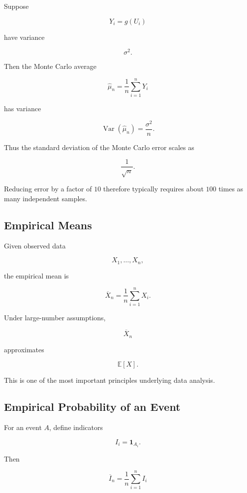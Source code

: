 Suppose

\[
Y_i=g(U_i)
\]

have variance

\[
\sigma^2.
\]

Then the Monte Carlo average

\[
\widehat{\mu}_n
=
\frac1n
\sum_{i=1}^{n}Y_i
\]

has variance

\[
\boxed{
\operatorname{Var}(\widehat{\mu}_n)
=
\frac{\sigma^2}{n}.
}
\]

Thus the standard deviation of the Monte Carlo error scales as

\[
\boxed{
\frac1{\sqrt{n}}.
}
\]

Reducing error by a factor of \(10\) therefore typically requires about
\(100\) times as many independent samples.

\subsection{Empirical Means}
\label{subsec:empirical-means}

Given observed data

\[
X_1,\ldots,X_n,
\]

the empirical mean is

\[
\boxed{
\overline{X}_n
=
\frac1n
\sum_{i=1}^{n}X_i.
}
\]

Under large-number assumptions,

\[
\overline{X}_n
\]

approximates

\[
\mathbb{E}[X].
\]

This is one of the most important principles underlying data analysis.

\subsection{Empirical Probability of an Event}
\label{subsec:empirical-event-probability}

For an event \(A\), define indicators

\[
I_i
=
\mathbf{1}_{A_i}.
\]

Then

\[
\overline{I}_n
=
\frac1n
\sum_{i=1}^{n}
I_i
\]

